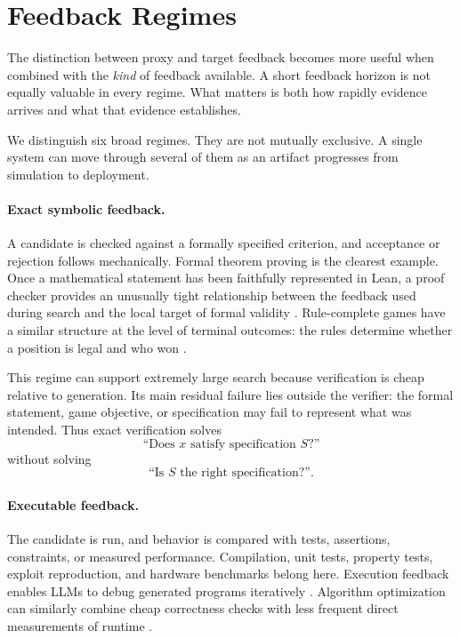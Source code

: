 \section{Feedback Regimes}
\label{sec:feedback-regimes}

The distinction between proxy and target feedback becomes more useful when combined
with the \emph{kind} of feedback available.  A short feedback horizon is not equally
valuable in every regime.  What matters is both how rapidly evidence arrives and what
that evidence establishes.

We distinguish six broad regimes.  They are not mutually exclusive.  A single system
can move through several of them as an artifact progresses from simulation to
deployment.

\paragraph{Exact symbolic feedback.}
A candidate is checked against a formally specified criterion, and acceptance or
rejection follows mechanically.  Formal theorem proving is the clearest example.
Once a mathematical statement has been faithfully represented in Lean, a proof
checker provides an unusually tight relationship between the feedback used during
search and the local target of formal validity
\parencite{hubert2025alphaproof}.  Rule-complete games have a similar structure at the
level of terminal outcomes: the rules determine whether a position is legal and who
won \parencite{silver2017alphagozero}.

This regime can support extremely large search because verification is cheap relative
to generation.  Its main residual failure lies outside the verifier: the formal
statement, game objective, or specification may fail to represent what was intended.
Thus exact verification solves
\[
    \text{``Does \(x\) satisfy specification \(S\)?''}
\]
without solving
\[
    \text{``Is \(S\) the right specification?''}.
\]

\paragraph{Executable feedback.}
The candidate is run, and behavior is compared with tests, assertions, constraints, or
measured performance.  Compilation, unit tests, property tests, exploit reproduction,
and hardware benchmarks belong here.  Execution feedback enables LLMs to debug
generated programs iteratively \parencite{chen2023selfdebug}.  Algorithm optimization can
similarly combine cheap correctness checks with less frequent direct measurements of
runtime \parencite{mankowitz2023alphadev}.

